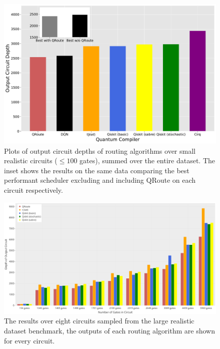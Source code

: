 \begin{figure}[t]
    \includegraphics[width=\linewidth]{figures/qroute/realistic_small_benchmark.pdf}
    \caption{\label{fig:results-small}
        Plots of output circuit depths of routing algorithms over small realistic circuits ($\leq 100$ gates), summed over the entire dataset. The inset shows the results on the same data comparing the best performant scheduler excluding and including QRoute on each circuit respectively.}
\end{figure}



\begin{figure}[ht]
    \centering
    \includegraphics[width=\linewidth]{figures/qroute/realistic_large_benchmark.pdf}
    \caption{\label{fig:results-large}
        The results over eight circuits sampled from the large realistic dataset benchmark, the outputs of each routing algorithm are shown for every circuit.}
\end{figure}




